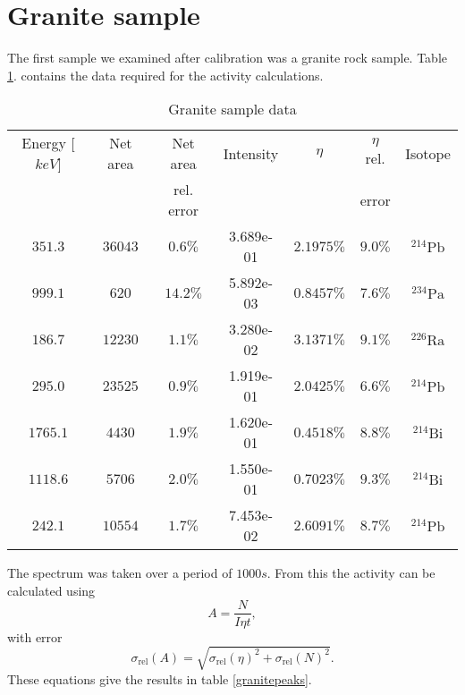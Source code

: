 \documentclass[pdftex,12pt,a4paper]{article}
\begin{document}
	\section{Granite sample}
		The first sample we examined after calibration was a granite rock sample. Table \ref{granitedata}. contains the data required for the activity calculations.
		\begin{table}[H]
		\centering
		\begin{tabular}{|c|c|c|c|c|c|c|}
			\hline
			Energy [$keV$] & Net area & Net area   & Intensity & $\eta$ & $\eta$ rel. & Isotope \\
			               &          & rel. error &           &        & error       &         \\
			\hline
            $351.3$ & $36043$ & $0.6\%$ & 3.689e-01 & $2.1975\%$ & $9.0\%$ & $^{214}\text{Pb}$ \\
            $999.1$ & $620$ & $14.2\%$ & 5.892e-03 & $0.8457\%$ & $7.6\%$ & $^{234}\text{Pa}$ \\
            $186.7$ & $12230$ & $1.1\%$ & 3.280e-02 & $3.1371\%$ & $9.1\%$ & $^{226}\text{Ra}$ \\
            $295.0$ & $23525$ & $0.9\%$ & 1.919e-01 & $2.0425\%$ & $6.6\%$ & $^{214}\text{Pb}$ \\
            $1765.1$ & $4430$ & $1.9\%$ & 1.620e-01 & $0.4518\%$ & $8.8\%$ & $^{214}\text{Bi}$ \\
            $1118.6$ & $5706$ & $2.0\%$ & 1.550e-01 & $0.7023\%$ & $9.3\%$ & $^{214}\text{Bi}$ \\
            $242.1$ & $10554$ & $1.7\%$ & 7.453e-02 & $2.6091\%$ & $8.7\%$ & $^{214}\text{Pb}$ \\
			\hline
		\end{tabular}
		\caption{Granite sample data}
		 \label{granitedata}
		\end{table}
		The spectrum was taken over a period of $1000s$. From this the activity can be calculated using
		\begin{equation}
			A = \frac{N}{I\eta t},
		\end{equation}
		with error
		\begin{equation}
			\sigma_{\text{rel}}(A) = \sqrt{\sigma_{\text{rel}}(\eta)^2 + \sigma_{\text{rel}}(N)^2}.
		\end{equation}
		These equations give the results in table \ref{granitepeaks}.
\end{document}
